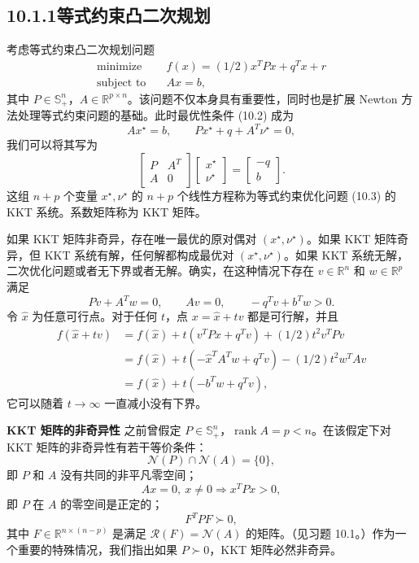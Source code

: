 \documentclass[UTF8,12pt,a4paper,fontset=fandol]{ctexart}
\begin{document}
\subsection*{10.1.1\quad 等式约束凸二次规划}

考虑等式约束凸二次规划问题
\begin{equation}
\begin{aligned}
\text{minimize}\quad & f(x)=(1/2)x^TPx+q^Tx+r\\
\text{subject to}\quad & Ax=b,
\end{aligned}
\tag{10.3}
\end{equation}
其中 $P\in\mathbb{S}_+^n$，$A\in\mathbb{R}^{p\times n}$。该问题不仅本身具有重要性，同时也是扩展 Newton 方法处理等式约束问题的基础。此时最优性条件 (10.2) 成为
\[
Ax^\star=b,\qquad Px^\star+q+A^T\nu^\star=0,
\]
我们可以将其写为
\begin{equation}
\begin{bmatrix}
P & A^T\\
A & 0
\end{bmatrix}
\begin{bmatrix}
x^\star\\
\nu^\star
\end{bmatrix}
=
\begin{bmatrix}
-q\\
b
\end{bmatrix}.
\tag{10.4}
\end{equation}
这组 $n+p$ 个变量 $x^\star,\nu^\star$ 的 $n+p$ 个线性方程称为等式约束优化问题 (10.3) 的 KKT 系统。系数矩阵称为 KKT 矩阵。

如果 KKT 矩阵非奇异，存在唯一最优的原对偶对 $(x^\star,\nu^\star)$。如果 KKT 矩阵奇异，但 KKT 系统有解，任何解都构成最优对 $(x^\star,\nu^\star)$。如果 KKT 系统无解，二次优化问题或者无下界或者无解。确实，在这种情况下存在 $v\in\mathbb{R}^n$ 和 $w\in\mathbb{R}^p$ 满足
\[
Pv+A^Tw=0,\qquad Av=0,\qquad -q^Tv+b^Tw>0.
\]
令 $\hat{x}$ 为任意可行点。对于任何 $t$，点 $x=\hat{x}+tv$ 都是可行解，并且
\[
\begin{aligned}
f(\hat{x}+tv)
&=f(\hat{x})+t(v^TP\hat{x}+q^Tv)+(1/2)t^2v^TPv\\
&=f(\hat{x})+t(-\hat{x}^TA^Tw+q^Tv)-(1/2)t^2w^TAv\\
&=f(\hat{x})+t(-b^Tw+q^Tv),
\end{aligned}
\]
它可以随着 $t\to\infty$ 一直减小没有下界。

\noindent\textbf{KKT 矩阵的非奇异性}\quad
之前曾假定 $P\in\mathbb{S}_+^n$，$\operatorname{rank}A=p<n$。在该假定下对 KKT 矩阵的非奇异性有若干等价条件：
\[
\mathcal{N}(P)\cap\mathcal{N}(A)=\{0\},
\]
即 $P$ 和 $A$ 没有共同的非平凡零空间；
\[
Ax=0,\ x\neq 0\Longrightarrow x^TPx>0,
\]
即 $P$ 在 $A$ 的零空间是正定的；
\[
F^TPF\succ 0,
\]
其中 $F\in\mathbb{R}^{n\times(n-p)}$ 是满足 $\mathcal{R}(F)=\mathcal{N}(A)$ 的矩阵。（见习题 10.1。）作为一个重要的特殊情况，我们指出如果 $P\succ 0$，KKT 矩阵必然非奇异。
\end{document}
